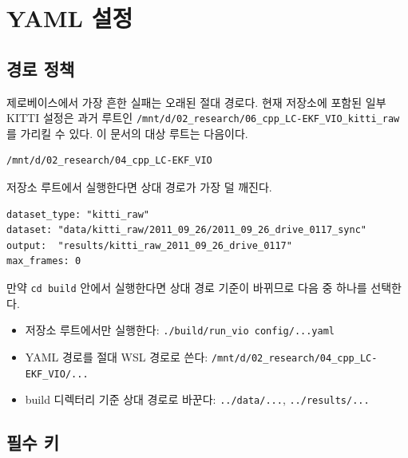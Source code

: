 \documentclass[11pt,a4paper,oneside]{report}
\begin{document}
\chapter{YAML 설정}

\section{경로 정책}

제로베이스에서 가장 흔한 실패는 오래된 절대 경로다. 현재 저장소에 포함된 일부 KITTI
설정은 과거 루트인 \texttt{/mnt/d/02\_research/06\_cpp\_LC-EKF\_VIO\_kitti\_raw}를
가리킬 수 있다. 이 문서의 대상 루트는 다음이다.

\begin{lstlisting}[style=shell]
/mnt/d/02_research/04_cpp_LC-EKF_VIO
\end{lstlisting}

저장소 루트에서 실행한다면 상대 경로가 가장 덜 깨진다.

\begin{lstlisting}[style=yaml,caption={권장 경로 설정}]
dataset_type: "kitti_raw"
dataset: "data/kitti_raw/2011_09_26/2011_09_26_drive_0117_sync"
output:  "results/kitti_raw_2011_09_26_drive_0117"
max_frames: 0
\end{lstlisting}

만약 \texttt{cd build} 안에서 실행한다면 상대 경로 기준이 바뀌므로 다음 중 하나를 선택한다.

\begin{itemize}[leftmargin=1.4em]
\item 저장소 루트에서만 실행한다: \texttt{./build/run\_vio config/...yaml}
\item YAML 경로를 절대 WSL 경로로 쓴다: \texttt{/mnt/d/02\_research/04\_cpp\_LC-EKF\_VIO/...}
\item build 디렉터리 기준 상대 경로로 바꾼다: \texttt{../data/...}, \texttt{../results/...}
\end{itemize}

\section{필수 키}
\end{document}
